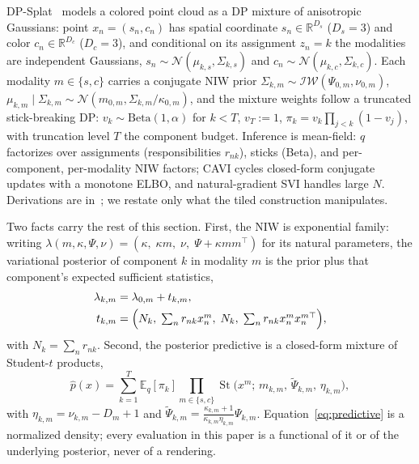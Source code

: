  DP-Splat~\cite{dong2026dpsplat} models a colored point cloud as a
DP mixture of anisotropic Gaussians: point
$x_n = (s_n, c_n)$ has spatial coordinate $s_n \in \mathbb{R}^{D_s}$
($D_s{=}3$) and color $c_n \in \mathbb{R}^{D_c}$ ($D_c{=}3$), and
conditional on its assignment $z_n = k$ the modalities are independent
Gaussians, $s_n \sim \mathcal{N}(\mu_{k,s}, \Sigma_{k,s})$ and
$c_n \sim \mathcal{N}(\mu_{k,c}, \Sigma_{k,c})$.
Each modality $m \in \{s, c\}$ carries a conjugate NIW prior
$\Sigma_{k,m} \sim \mathcal{IW}(\Psi_{0,m}, \nu_{0,m})$,
$\mu_{k,m} \mid \Sigma_{k,m} \sim
\mathcal{N}(m_{0,m}, \Sigma_{k,m}/\kappa_{0,m})$, and the mixture weights
follow a truncated stick-breaking DP:
$v_k \sim \mathrm{Beta}(1, \alpha)$ for $k < T$, $v_T := 1$,
$\pi_k = v_k \prod_{j<k}(1 - v_j)$, with truncation level $T$ the
component budget. Inference is mean-field: $q$ factorizes
over assignments (responsibilities $r_{nk}$), sticks (Beta),
and per-component, per-modality NIW factors; CAVI cycles closed-form
conjugate updates with a
monotone ELBO, and natural-gradient SVI
handles large $N$. Derivations are in~\cite{dong2026dpsplat}; we restate only what the tiled construction
manipulates.

 Two facts carry the rest of this section. First, the NIW is exponential
family: writing $\lambda(m, \kappa, \Psi, \nu) =
(\kappa,\; \kappa m,\; \nu,\; \Psi + \kappa m m^{\!\top})$ for its natural
parameters, the variational posterior of component $k$ in modality $m$ is
the prior plus that component's expected sufficient statistics,
\begin{align}
\lambda_{k,m} &= \lambda_{0,m} + t_{k,m}, \notag \\
t_{k,m} &= \Big(N_k,\; \textstyle\sum_n r_{nk} x^m_n,\; N_k,\;
\textstyle\sum_n r_{nk} x^m_n x^{m\top}_n\Big),
\label{eq:natadd}
\end{align}
with $N_k = \sum_n r_{nk}$. Second, the posterior predictive is a
closed-form mixture of Student-$t$ products,
\begin{equation}
\hat{p}(x) = \sum_{k=1}^{T} \mathbb{E}_q[\pi_k]
\prod_{m \in \{s,c\}}
\operatorname{St}\big(x^m;\, m_{k,m},\, \tilde{\Psi}_{k,m},\,
\eta_{k,m}\big),
\label{eq:predictive}
\end{equation}
with $\eta_{k,m} = \nu_{k,m} - D_m + 1$ and $\tilde{\Psi}_{k,m} =
\frac{\kappa_{k,m}+1}{\kappa_{k,m}\eta_{k,m}} \Psi_{k,m}$.
Equation~\eqref{eq:predictive} is a normalized density; every evaluation
in this paper is a functional of it or of the underlying posterior,
never of a rendering.

